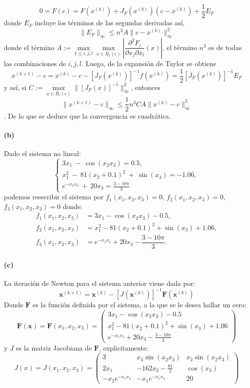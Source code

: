 $$0=F(c)=F(x^{(k)})+J_F(x^{(k)})(c-x^{(k)})+\frac{1}{2}E_F$$
donde $E_F$ incluye los t\'erminos de las segundas derivadas as\'i,
$$\|E_F\|_\infty\leq n^3A\|c-x^{(k)}\|^2_\infty$$
donde el t\'ermino $A:=\underset{1\leq i,j,l}{\max}\underset{x\in\overline{B}_\epsilon(c)}{\max}\left |\dfrac{\partial^2 F_i}{\partial x_j \partial x_l}(x)\right |$, el t\'ermino $n^3$ es de todas las combinaciones de $i,j,l$. Luego, de la expansi\'on de Taylor se obtiene
$$x^{(k+1)}-c=x^{(k)}-c-[J_F(x^{(k)})]^{-1}f(x^{(k)})=\frac{1}{2}[J_F(x^{(k)})]^{-1}E_F$$
y as\'i, si $C:=\underset{x\in\overline{B}_\epsilon(c)}{\max}\|[J_F(x)]^{-1}\|_\infty^2$, entonces
$$\|x^{(k+1)}-c\|_\infty\leq\frac{1}{2}n^3CA\|x^{(k)}-c\|_\infty^2$$.
De lo que se deduce que la convergencia es cuadr\'atica.
\paragraph{(b)}
Dado el sistema no lineal:
$$
\begin{cases}
3x_1 \ - \ \cos(x_2 x_3) = 0.5,\\
x_1^2 \ - \ 81(x_2+0.1)^2 \ + \ \sin(x_3) = -1.06,\\
e^{-x_1 x_2} \ + \ 20x_3 = \frac{3-10\pi}{3}
\end{cases}
$$
podemos reescribir el sistema por $f_1(x_1,x_2,x_3)=0$, $f_2(x_1,x_2,x_3)=0$,\\ $f_3(x_1,x_2,x_3)=0$ donde:
\begin{align*}
f_1(x_1,x_2,x_3)&=3x_1-\cos(x_2 x_3)-0.5,\\
f_2(x_1,x_2,x_3)&=x_1^2-81(x_2+0.1)^2+\sin(x_3)+1.06,\\
f_3(x_1,x_2,x_3)&=e^{-x_1 x_2}+20x_3-\dfrac{3-10\pi}{3}.
\end{align*}
\paragraph{(c)}
La iteraci\'on de Newton para el sistema anterior viene dada por:
$$\textbf{x}^{(k+1)} = \textbf{x}^{(k)} - \left[ J(\textbf{x}^{(k)}) \right]^{-1} \textbf{F}(\textbf{x}^{(k)})$$
Donde $\textbf{F}$ es la funci\'on definida por el sistema, a la que se le desea hallar un cero:
$$\textbf{F}(\textbf{x})=\textbf{F}(x_1,x_2,x_3)=\begin{pmatrix}
3x_1-\cos(x_2x_3)-0.5\\
x_1^2-81(x_2+0.1)^2+\sin(x_3)+1.06\\
e^{-x_1x_2}+20x_3-\frac{3-10\pi}{3}
\end{pmatrix}$$
y $J$ es la matriz Jacobiana de $\textbf{F}$, explicitamente:
$$J(x)=J(x_1,x_2,x_3)=
\begin{pmatrix}
3&x_3\sin(x_2 x_3)&x_2\sin(x_2x_3)\\
2x_1&-162x_2-\frac{81}{5}&\cos(x_3)\\
-x_2 e^{-x_1x_2}&-x_1 e^{-x_1x_2}&20
\end{pmatrix}
$$
